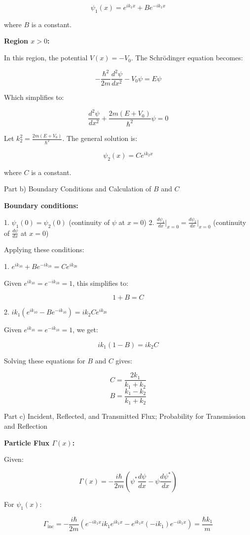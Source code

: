 \[
\psi_1(x) = e^{ik_1x} + Be^{-ik_1x}
\]

where \(B\) is a constant.

\textbf{Region \(x > 0\):}

In this region, the potential \(V(x) = -V_0\). The Schrödinger equation becomes:

\[
-\frac{\hbar^2}{2m} \frac{d^2\psi}{dx^2} - V_0\psi = E\psi
\]

Which simplifies to:

\[
\frac{d^2\psi}{dx^2} + \frac{2m(E+V_0)}{\hbar^2}\psi = 0
\]

Let \(k_2^2 = \frac{2m(E+V_0)}{\hbar^2}\). The general solution is:

\[
\psi_2(x) = Ce^{ik_2x}
\]

where \(C\) is a constant.

Part b) Boundary Conditions and Calculation of \(B\) and \(C\)

\textbf{Boundary conditions:}

1. \(\psi_1(0) = \psi_2(0)\) (continuity of \(\psi\) at \(x=0\))
2. \(\frac{d\psi_1}{dx}\bigg|_{x=0} = \frac{d\psi_2}{dx}\bigg|_{x=0}\) (continuity of \(\frac{d\psi}{dx}\) at \(x=0\))

Applying these conditions:

1. \(e^{ik_10} + Be^{-ik_10} = Ce^{ik_20}\)

Given \(e^{ik_10} = e^{-ik_10} = 1\), this simplifies to:

\[
1 + B = C
\]

2. \(ik_1(e^{ik_10} - Be^{-ik_10}) = ik_2Ce^{ik_20}\)

Given \(e^{ik_10} = e^{-ik_10} = 1\), we get:

\[
ik_1(1 - B) = ik_2C
\]

Solving these equations for \(B\) and \(C\) gives:

\[
C = \frac{2k_1}{k_1+k_2}
\]
\[
B = \frac{k_1-k_2}{k_1+k_2}
\]

Part c) Incident, Reflected, and Transmitted Flux; Probability for Transmission and Reflection

\textbf{Particle Flux \(\Gamma(x)\):}

Given:

\[
\Gamma(x) = -\frac{i\hbar}{2m} \left(\psi^{*}\frac{d\psi}{dx} - \psi\frac{d\psi^{*}}{dx} \right)
\]

For \(\psi_1(x)\):

\[
\Gamma_{\text{inc}} = -\frac{i\hbar}{2m} \left( e^{-ik_1x}ik_1e^{ik_1x} - e^{ik_1x}(-ik_1)e^{-ik_1x} \right) = \frac{\hbar k_1}{m}
\]

